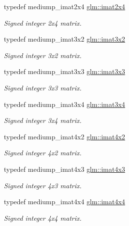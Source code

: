 \begin{DoxyCompactItemize}
typedef mediump\-\_\-imat2x4 \hyperlink{group__gtc__matrix__integer_gafe2d058e164fd1badace451ffcf4ae46}{glm\-::imat2x4}
\begin{DoxyCompactList}\small\item\em Signed integer 2x4 matrix. \end{DoxyCompactList}\item 
typedef mediump\-\_\-imat3x2 \hyperlink{group__gtc__matrix__integer_ga04deef94cdfdd3b3b2706e10a32ef7f3}{glm\-::imat3x2}
\begin{DoxyCompactList}\small\item\em Signed integer 3x2 matrix. \end{DoxyCompactList}\item 
typedef mediump\-\_\-imat3x3 \hyperlink{group__gtc__matrix__integer_gaeff9ef8f56cccc828d6b897923e75402}{glm\-::imat3x3}
\begin{DoxyCompactList}\small\item\em Signed integer 3x3 matrix. \end{DoxyCompactList}\item 
typedef mediump\-\_\-imat3x4 \hyperlink{group__gtc__matrix__integer_gaee5507e6cbbdd05841a0c174e60dd036}{glm\-::imat3x4}
\begin{DoxyCompactList}\small\item\em Signed integer 3x4 matrix. \end{DoxyCompactList}\item 
typedef mediump\-\_\-imat4x2 \hyperlink{group__gtc__matrix__integer_ga7e733984837e0e7aa9f4aac18f632f63}{glm\-::imat4x2}
\begin{DoxyCompactList}\small\item\em Signed integer 4x2 matrix. \end{DoxyCompactList}\item 
typedef mediump\-\_\-imat4x3 \hyperlink{group__gtc__matrix__integer_gaa4cca8e80c0603239eda452860063844}{glm\-::imat4x3}
\begin{DoxyCompactList}\small\item\em Signed integer 4x3 matrix. \end{DoxyCompactList}\item 
typedef mediump\-\_\-imat4x4 \hyperlink{group__gtc__matrix__integer_ga367d8d5281ff82f1215a227dd2ea5ba9}{glm\-::imat4x4}
\begin{DoxyCompactList}\small\item\em Signed integer 4x4 matrix. \end{DoxyCompactList}\item 

\end{DoxyCompactItemize}
